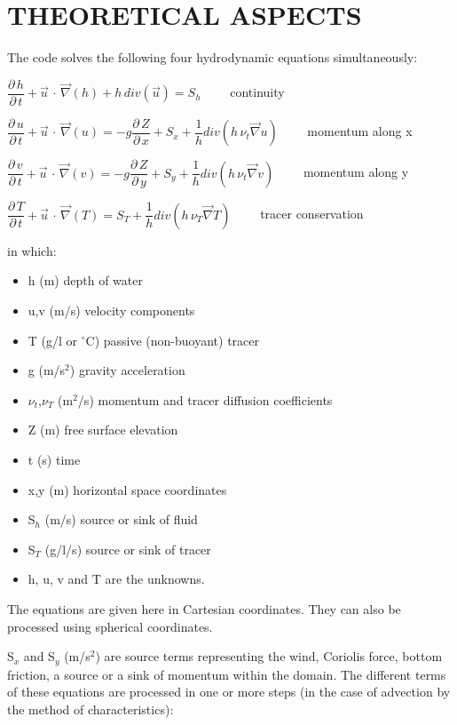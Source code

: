 
\chapter{  THEORETICAL ASPECTS}
\label{ch:theo:asp}
 The  code solves the following four hydrodynamic equations simultaneously:


 $\dfrac{\partial \, h}{\partial \, t} +\vec{u}\, \cdot \, \vec{\nabla }(h)+h\, div(\vec{u})=S_{h} \qquad$    continuity



 $\dfrac{\partial \, u}{\partial \, t} +\vec{u}\, \cdot \, \vec{\nabla }(u)=-g\dfrac{\partial \, Z}{\partial \, x} +S_{x} +\dfrac{1}{h} div(h\, \nu _{t} \vec{\nabla }u)\qquad$  momentum along x


 $\dfrac{\partial \, v}{\partial \, t} +\vec{u}\, \cdot \, \vec{\nabla }(v)=-g\dfrac{\partial \, Z}{\partial \, y} +S_{y} +\dfrac{1}{h} div(h\, \nu _{t} \vec{\nabla }v)\qquad$  momentum along y


 $\dfrac{\partial \, T}{\partial \, t} +\vec{u}\, \cdot \, \vec{\nabla }(T)=S_{T} +\dfrac{1}{h} div(h\, \nu _{T} \vec{\nabla }T)\qquad$   tracer conservation

 
in which:

\begin{itemize}
       \item   h (m)  depth of water
       \item  u,v (m/s)  velocity components
       \item  T (g/l or ${}^\circ$C) passive (non-buoyant) tracer
       \item  g (m/s$^2$)  gravity acceleration
       \item  $\nu_t$,$\nu_T$ (m$^2$/s)  momentum and tracer diffusion coefficients
       \item  Z (m)  free surface elevation
       \item  t (s)  time
       \item  x,y (m)  horizontal space coordinates
       \item  S${}_{h}$ (m/s)  source or sink of fluid
       \item  S${}_{T}$ (g/l/s)  source or sink of tracer
       \item   h, u, v and T are the unknowns.
\end{itemize}

 The equations are given here in Cartesian coordinates. They can also be processed using spherical coordinates.

  S$_x$ and S$_y$ (m/s$^2$) are source terms representing the wind, Coriolis force, bottom friction, a source or a sink of momentum within the domain. The different terms of these equations are processed in one or more steps (in the case of advection by the method of characteristics):

